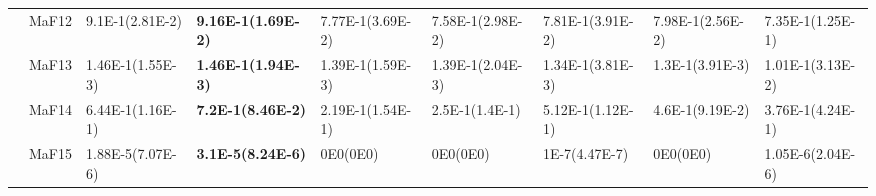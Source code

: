 \documentclass[]{article}
\begin{document}
\begin{landscape}
\begin{table}
\begin{footnotesize}
\begin{tabular}{|l|l|l|l|l|l|l|l|l|}
 & MaF12 & \cellcolor{gray95} 9.1E-1(2.81E-2) & \cellcolor{gray95} {\bf 9.16E-1(1.69E-2)} & 7.77E-1(3.69E-2) & 7.58E-1(2.98E-2) & 7.81E-1(3.91E-2) & 7.98E-1(2.56E-2) & 7.35E-1(1.25E-1)\\
 & MaF13 & \cellcolor{gray95} 1.46E-1(1.55E-3) & \cellcolor{gray95} {\bf 1.46E-1(1.94E-3)} & 1.39E-1(1.59E-3) & 1.39E-1(2.04E-3) & 1.34E-1(3.81E-3) & 1.3E-1(3.91E-3) & 1.01E-1(3.13E-2)\\
 & MaF14 & \cellcolor{gray95} 6.44E-1(1.16E-1) & \cellcolor{gray95} {\bf 7.2E-1(8.46E-2)} & 2.19E-1(1.54E-1) & 2.5E-1(1.4E-1) & 5.12E-1(1.12E-1) & 4.6E-1(9.19E-2) & 3.76E-1(4.24E-1)\\
 & MaF15 & \cellcolor{gray95} 1.88E-5(7.07E-6) & \cellcolor{gray95} {\bf 3.1E-5(8.24E-6)} & 0E0(0E0) & 0E0(0E0) & 1E-7(4.47E-7) & 0E0(0E0) & 1.05E-6(2.04E-6)\\
\hline


\end{tabular}
\end{footnotesize}
\end{table}
\end{landscape}
\end{document}
